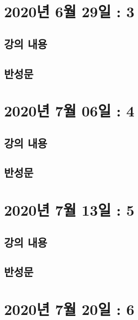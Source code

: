 \documentclass[12pt, a4paper, oneside]{book}
\let\stdsection\section
\renewcommand\section{\newpage\stdsection}
\begin{document}
	\section{2020년 6월 29일 : 3}

		\subsection{강의 내용}

		\subsection{반성문}


%
	\section{2020년 7월 06일 : 4}

		\subsection{강의 내용}

		\subsection{반성문}


%
	\section{2020년 7월 13일 : 5}

		\subsection{강의 내용}

		\subsection{반성문}


%
	\section{2020년 7월 20일 : 6}
\end{document}
